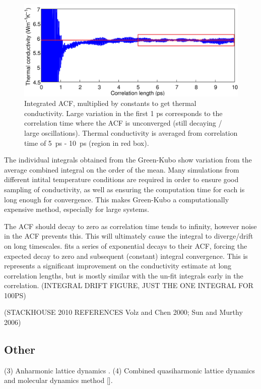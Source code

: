 \begin{figure}[h]
\includegraphics[width=\linewidth]{Figures/gk_int.png}
\caption{Integrated ACF, multiplied by constants to get thermal conductivity. Large variation in the first 1 ps corresponds to the correlation time where the ACF is unconverged (still decaying / large oscillations). Thermal conductivity is averaged from correlation time of 5~ps - 10~ps (region in red box).}
\label{fig:gk_int}
\end{figure}

The individual integrals obtained from the Green-Kubo show variation from the average combined integral on the order of the mean. Many simulations from different intital temperature conditions are required in order to ensure good sampling of conductivity, as well as ensuring the computation time for each is long enough for convergence. This makes Green-Kubo a computationally expensive method, especially for large systems.

The ACF should decay to zero as correlation time tends to infinity, however noise in the ACF prevents this. This will ultimately cause the integral to diverge/drift on long timescales. \citet{Howell2012} fits a series of exponential decays to their ACF, forcing the expected decay to zero and subsequent (constant) integral convergence. This is represents a significant improvement on the conductivity estimate at long correlation lengths, but is mostly similar with the un-fit integrals early in the correlation. (INTEGRAL DRIFT FIGURE, JUST THE ONE INTEGRAL FOR 100PS)

(STACKHOUSE 2010 REFERENCES Volz and Chen 2000; Sun and Murthy 2006)



\subsection{Other}
(3) Anharmonic lattice dynamics \citep{Tang2009}. %
(4) Combined quasiharmonic lattice dynamics and molecular dynamics method [\citet{DeKoker2009}].

